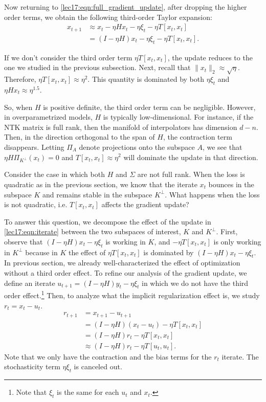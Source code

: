 Now returning to \eqref{lec17:eqn:full_gradient_update}, after dropping the higher order terms, we obtain the following third-order Taylor expansion:
\begin{align}
x_{t+1} &\approx x_t - \eta Hx_t - \eta\xi_t - \eta T[x_t,x_t]\\
&= (I-\eta H)x_t - \eta \xi_t - \eta T [x_t,x_t].\label{lec17:eqn:iterate}
\end{align}

If we don't consider the third order term $\eta T [x_t,x_t]$, the update reduces to the one we studied in the previous subsection. Next, recall that $\|x_t\|_2 \approx \sqrt{\eta}$. Therefore, $\eta T[x_t,x_t] \approx \eta^2$. This quantity is dominated by both $\eta \xi_t$ and $\eta Hx_t \approx {\eta}^{1.5}$. 

So, when $H$ is positive definite, the third order term can be negligible. However, in overparametrized models, $H$ is typically low-dimensional. For instance, if the NTK matrix is full rank, then the manifold of interpolators has dimension $d-n$. Then, in the direction orthogonal to the span of $H$, the contraction term disappears. Letting $\Pi_{A}$ denote projections onto the subspace $A$, we see that $\eta H \Pi_{K^\perp}(x_t) = 0$ and $T[x_t,x_t] \approx \eta^2$ will dominate the update in that direction.

Consider the case in which both $H$ and $\Sigma$ are not full rank. When the loss is quadratic as in the previous section, we know that the iterate $x_t$ bounces in the subspace $K$ and remains stable in the subspace $K^\perp$. What happens when the loss is not quadratic, i.e. $T[x_t,x_t]$ affects the gradient update? 

To answer this question, we decompose the effect of the update in \eqref{lec17:eqn:iterate} between the two subspaces of interest, $K$ and $K^\perp$. First, observe that $(I-\eta H)x_t - \eta \xi_t$ is working in $K$, and $- \eta T [x_t,x_t]$ is only working in $K^\perp$ because in $K$ the effect of $\eta T [x_t,x_t]$ is dominated by $(I-\eta H)x_t - \eta \xi_t$. In previous section, we already well-characterized the effect of optimization without a third order effect. To refine our analysis of the gradient update, we define an iterate $u_{t+1} = (I - \eta H)y_t - \eta \xi_t$ in which we do not have the third order effect.\footnote{Note that $\xi_t$ is the same for each $u_t$ and $x_t$.} Then, to analyze what the implicit regularization effect is, we study $r_t = x_t - u_t$.
\begin{align*}
r_{t + 1} &= x_{t+1} - u_{t+1}\\
&= (I-\eta H)(x_t - u_t) - \eta T[x_t,x_t]\\
&= (I-\eta H)r_t - \eta T[x_t,x_t]\\
&\approx (I-\eta H)r_t - \eta T[u_t,u_t].
\end{align*}
Note that we only have the contraction and the bias terms for the $r_t$ iterate. The stochasticity term $\eta \xi_t$ is canceled out. 

